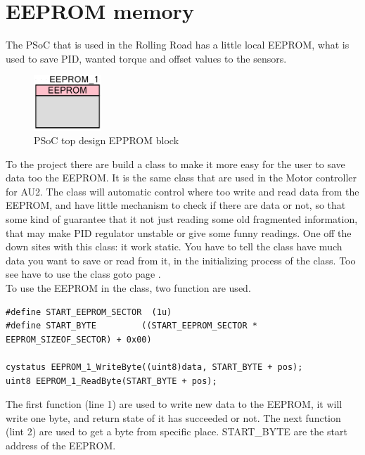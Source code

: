 \newpage
\section{EEPROM memory}
The PSoC that is used in the Rolling Road has a little local EEPROM, what is used to save PID, wanted torque and offset values to the sensors.

\begin{figure}[H]
	\centering
	\includegraphics [width=1in]{Software/Pictures/EEPROM_block.PNG}
	\caption{PSoC top design EPPROM block}
	\label{fig:EEPROM_block}
\end{figure}

To the project there are build a class to make it more easy for the user to save data too the EEPROM. It is the same class that are used in the Motor controller for AU2. The class will automatic control where too write and read data from the EEPROM, and have little mechanism to check if there are data or not, so that some kind of guarantee that it not just reading some old fragmented information, that may make PID regulator unstable or give some funny readings. One off the down sites with this class: it work static. You have to tell the class have much data you want to save or read from it, in the initializing process of the class. Too see have to use the class goto page \pageref{table:Class_description_EEPROM_RR_PSoC}. \\
To use the EEPROM in the class, two function are used.

\lstset{language=C}
\begin{lstlisting}
#define START_EEPROM_SECTOR  (1u)
#define START_BYTE         ((START_EEPROM_SECTOR * EEPROM_SIZEOF_SECTOR) + 0x00)

cystatus EEPROM_1_WriteByte((uint8)data, START_BYTE + pos);
uint8 EEPROM_1_ReadByte(START_BYTE + pos);
\end{lstlisting}

The first function (line 1) are used to write new data to the EEPROM, it will write one byte, and return state of it has succeeded or not. The next function (lint 2) are used to get a byte from specific place. START\_BYTE are the start address of the EEPROM. 